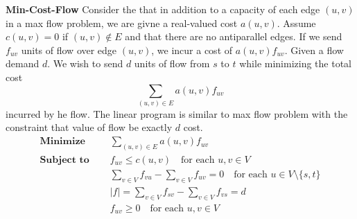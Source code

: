 \documentclass[11pt]{article}
\begin{document}
\begin{defn*}
    \textbf{Min-Cost-Flow} Consider the that in addition to a capacity of each edge $(u,v)$ in a max flow problem, we are givne a real-valued cost $a(u,v)$. Assume $c(u,v) = 0$ if $(u,v)\not\in E$ and that there are no antiparallel edges. If we send $f_{uv}$ units of flow over edge $(u,v)$, we incur a cost of $a(u,v) f_{uv}$. Given a flow demand $d$. We wish to send $d$ units of flow from $s$ to $t$ while minimizing the total cost 
    \[
        \sum_{(u,v)\in E} a(u,v) f_{uv}
    \]
    incurred by he flow. The linear program is similar to max flow problem with the constraint that value of flow be exactly $d$ cost. 
    \begin{align*}
        \textbf{Minimize } \quad & \sum_{(u,v)\in E} a(u,v) f_{uv}\\
        \textbf{Subject to } \quad & f_{uv} \leq c(u,v) \quad \text{for each } u,v\in V\\
                                & \sum_{v\in V} f_{vu} - \sum_{v\in V} f_{uv} = 0 \quad \text{for each } u\in V \setminus \{s, t \}\\
                                & |f| = \sum_{v\in V} f_{sv} - \sum_{v\in V} f_{vs} = d \\
                                & f_{uv} \geq 0 \quad \text{for each } u,v\in V\\
    \end{align*}
\end{defn*}
\end{document}
